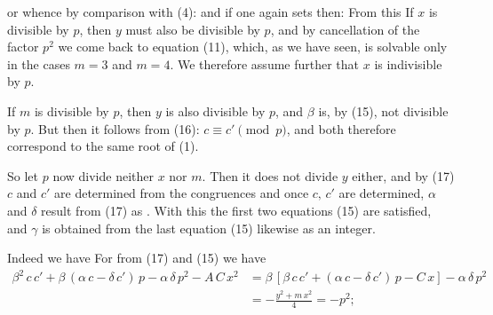 or
whence by comparison with (4):
and if one again sets
then:
From this
If $x$ is divisible by $p$, then $y$ must also be divisible by $p$, and by cancellation of the factor $p^2$ we come back to equation (11), which, as we have seen, is solvable only in the cases $m=3$ and $m=4$. We therefore assume further that $x$ is indivisible by $p$.

If $m$ is divisible by $p$, then $y$ is also divisible by $p$, and $\beta$ is, by (15), not divisible by $p$. But then it follows from (16): $c\equiv c' \pmod{p}$, and both therefore correspond to the same root of (1).

So let $p$ now divide neither $x$ nor $m$. Then it does not divide $y$ either, and by (17) $c$ and $c'$ are determined from the congruences
and once $c,\,c'$ are determined, $\alpha$ and $\delta$ result from (17) as . With this the first two equations (15) are satisfied, and $\gamma$ is obtained from the last equation (15) likewise as an integer.

Indeed we have
For from (17) and (15) we have
\[
\begin{aligned}
\beta^2\,c\,c'+\beta\,(\alpha\,c-\delta\,c')\,p-\alpha\,\delta\,p^2-A\,C\,x^2
&= \beta\,[\beta\,c\,c'+(\alpha\,c-\delta\,c')\,p-C\,x]-\alpha\,\delta\,p^2\\
&= -\frac{y^2+m\,x^2}{4} = -p^2;
\end{aligned}
\]
